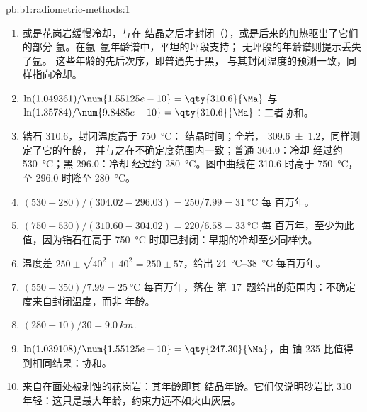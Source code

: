 \begin{solution}{pb:b1:radiometric-methods:1}
\begin{enumerate}
        形成时几乎不吸收氩。
  \item 或是花岗岩缓慢冷却，与在
        结晶之后才封闭（），或是后来的加热驱出了它们的部分
        氩。在氩–氩年龄谱中，平坦的坪段支持；
        无坪段的年龄谱则提示丢失了氩。
        这些年龄的先后次序，即普通先于黑，
        与其封闭温度的预测一致，同样指向冷却。
  \item $\ln(1.049361)/\num{1.55125e-10} = \qty{310.6}{\Ma}$ 与
        $\ln(1.35784)/\num{9.8485e-10} = \qty{310.6}{\Ma}$：二者协和。
  \item 锆石 \qty{310.6}{\Ma}，封闭温度高于 \qty{750}{\celsius}：
        结晶时间；全岩，
        \qty[uncertainty-mode=separate]{309.6(12)}{\Ma}，同样测定了它的年龄，
        并与之在不确定度范围内一致；普通 \qty{304.0}{\Ma}：冷却
        经过约 \qty{530}{\celsius}；黑 \qty{296.0}{\Ma}：冷却
        经过约 \qty{280}{\celsius}。图中曲线在
        \qty{310.6}{\Ma} 时高于 \qty{750}{\celsius}，
        至 \qty{296.0}{\Ma} 时降至 \qty{280}{\celsius}。
  \item $(530 - 280)/(304.02 - 296.03) = 250/7.99 = \qty{31}{\celsius}$ 每
        百万年。
  \item $(750 - 530)/(310.60 - 304.02) = 220/6.58 = \qty{33}{\celsius}$ 每
        百万年，至少为此值，因为锆石在高于
        \qty{750}{\celsius} 时即已封闭：早期的冷却至少同样快。
  \item 温度差 $250 \pm \sqrt{40^2 + 40^2} = 250 \pm
        57$，给出 \qtyrange{24}{38}{\celsius} 每百万年。
  \item $(550 - 350)/7.99 = \qty{25}{\celsius}$ 每百万年，落在
        第~17~题给出的范围内：不确定度来自封闭温度，而非
        年龄。
  \item $(280 - 10)/30 = \qty{9.0}{km}$.
  \item $\ln(1.039108)/\num{1.55125e-10} = \qty{247.30}{\Ma}$，由
        铀-235 比值得到相同结果：协和。
  \item 来自在面处被剥蚀的花岗岩：其年龄即其
        结晶年龄。它们仅说明砂岩比
        \qty{310}{\Ma} 年轻：这只是最大年龄，约束力远不如火山灰层。

\end{enumerate}
\end{solution}
